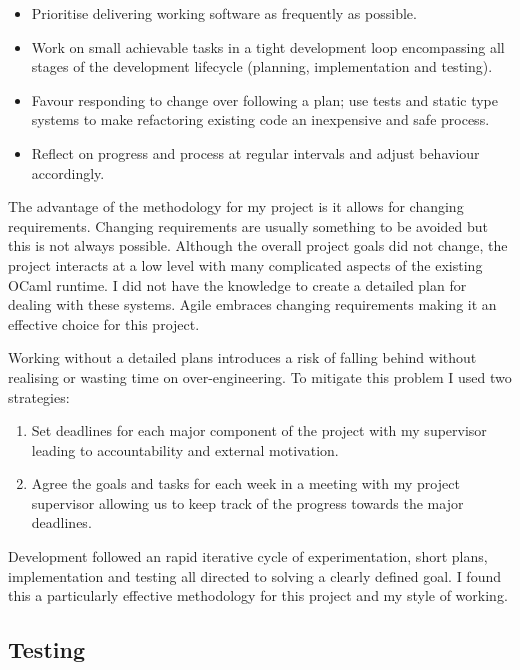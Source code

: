 \begin{itemize}
    \item Prioritise delivering working software as frequently as possible.
    \item Work on small achievable tasks in a tight development loop encompassing all stages of the
          development lifecycle (planning, implementation and testing).
    \item Favour responding to change over following a plan; use tests and static type systems to
          make refactoring existing code an inexpensive and safe process.
    \item Reflect on progress and process at regular intervals and adjust behaviour accordingly.
\end{itemize}

The advantage of the methodology for my project is it allows for changing requirements. Changing
requirements are  usually something to be avoided but this is not always possible.  Although the
overall project goals did not change, the project interacts at a low level with many complicated
aspects of the existing OCaml runtime. I did not have the knowledge to create a detailed plan for
dealing with these systems. Agile embraces changing requirements making it an effective choice for
this project.

Working without a detailed plans introduces a risk of falling behind without realising or wasting
time on over-engineering. To mitigate this problem I used two strategies:

\begin{enumerate}
    \item Set deadlines for each major component of the project with my supervisor leading to
          accountability and external motivation.
    \item Agree the goals and tasks for each week in a meeting with my project supervisor
          allowing us to keep track of the progress towards the major deadlines.
\end{enumerate}

Development followed an rapid iterative cycle of experimentation, short plans, implementation and
testing all directed to solving a clearly defined goal. I found this a particularly effective
methodology for this project and my style of working.

\subsection{Testing}


